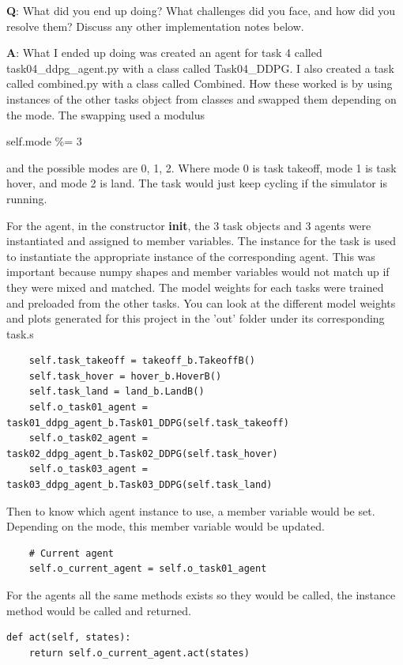 \documentclass[11pt]{article}
\begin{document}
\textbf{Q}: What did you end up doing? What challenges did you face, and
how did you resolve them? Discuss any other implementation notes below.

\textbf{A}: What I ended up doing was created an agent for task 4 called
task04\_ddpg\_agent.py with a class called Task04\_DDPG. I also created
a task called combined.py with a class called Combined. How these worked
is by using instances of the other tasks object from classes and swapped
them depending on the mode. The swapping used a modulus

self.mode \%= 3

and the possible modes are 0, 1, 2. Where mode 0 is task takeoff, mode 1
is task hover, and mode 2 is land. The task would just keep cycling if
the simulator is running.

For the agent, in the constructor \textbf{init}, the 3 task objects and
3 agents were instantiated and assigned to member variables. The
instance for the task is used to instantiate the appropriate instance of
the corresponding agent. This was important because numpy shapes and
member variables would not match up if they were mixed and matched. The
model weights for each tasks were trained and preloaded from the other
tasks. You can look at the different model weights and plots generated
for this project in the 'out' folder under its corresponding task.s

\begin{verbatim}
    self.task_takeoff = takeoff_b.TakeoffB()
    self.task_hover = hover_b.HoverB()
    self.task_land = land_b.LandB()
    self.o_task01_agent = task01_ddpg_agent_b.Task01_DDPG(self.task_takeoff)
    self.o_task02_agent = task02_ddpg_agent_b.Task02_DDPG(self.task_hover)
    self.o_task03_agent = task03_ddpg_agent_b.Task03_DDPG(self.task_land)
\end{verbatim}

Then to know which agent instance to use, a member variable would be
set. Depending on the mode, this member variable would be updated.

\begin{verbatim}
    # Current agent
    self.o_current_agent = self.o_task01_agent
\end{verbatim}

For the agents all the same methods exists so they would be called, the
instance method would be called and returned.

\begin{verbatim}
def act(self, states):
    return self.o_current_agent.act(states)
    
\end{verbatim}
\end{document}
